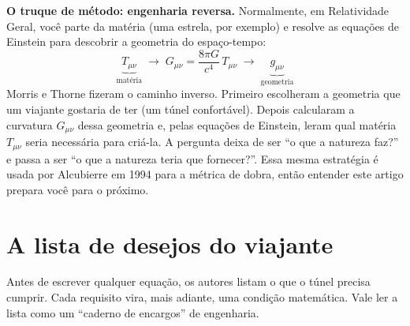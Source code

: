 \documentclass[11pt,a4paper]{article}
\begin{document}
\textbf{O truque de método: engenharia reversa.} Normalmente, em Relatividade Geral, você parte da matéria (uma
estrela, por exemplo) e resolve as equações de Einstein para descobrir a geometria do espaço-tempo:
\begin{equation*}
\underbrace{T_{\mu\nu}}_{\text{matéria}} \;\longrightarrow\; G_{\mu\nu} = \frac{8\pi G}{c^4}\, T_{\mu\nu}
\;\longrightarrow\; \underbrace{g_{\mu\nu}}_{\text{geometria}}
\end{equation*}
Morris e Thorne fizeram o caminho inverso. Primeiro escolheram a geometria que um viajante gostaria de ter (um túnel
confortável). Depois calcularam a curvatura $G_{\mu\nu}$ dessa geometria e, pelas equações de Einstein, leram qual
matéria $T_{\mu\nu}$ seria necessária para criá-la. A pergunta deixa de ser ``o que a natureza faz?'' e passa a ser
``o que a natureza teria que fornecer?''. Essa mesma estratégia é usada por Alcubierre em 1994 para a métrica de
dobra, então entender este artigo prepara você para o próximo.

\section{A lista de desejos do viajante}

Antes de escrever qualquer equação, os autores listam o que o túnel precisa cumprir. Cada requisito vira, mais
adiante, uma condição matemática. Vale ler a lista como um ``caderno de encargos'' de engenharia.
\end{document}
